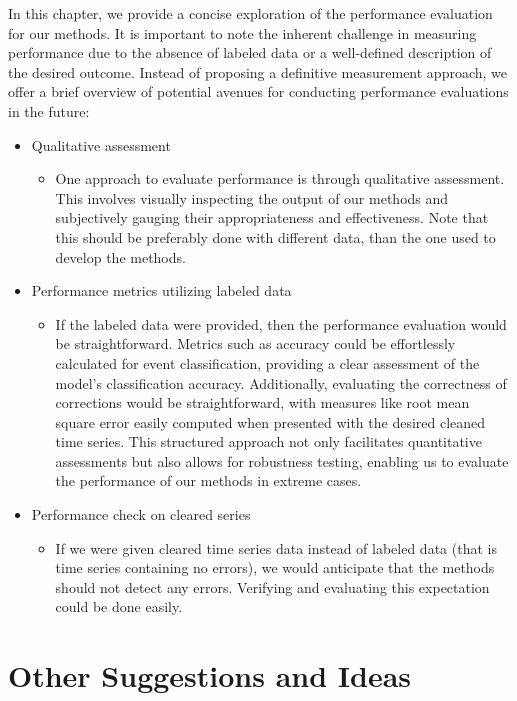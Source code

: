 \documentclass[12pt,a4paper]{article}
\begin{document}
In this chapter, we provide a concise exploration of the performance evaluation for our methods. It is important to note the inherent challenge in measuring performance due to the absence of labeled data or a well-defined description of the desired outcome. Instead of proposing a definitive measurement approach, we offer a brief overview of potential avenues for conducting performance evaluations in the future:
\begin{itemize}
    \item Qualitative assessment
    \begin{itemize}
        \item One approach  to evaluate performance is through qualitative assessment. This involves visually inspecting the output of our methods and subjectively gauging their appropriateness and effectiveness. Note that this should be preferably done with different data, than the one used to develop the methods.
    \end{itemize}
    \item Performance metrics utilizing labeled data
    \begin{itemize}
        \item If the labeled data were provided, then the performance evaluation would be straightforward. Metrics such as accuracy could be effortlessly calculated for event classification, providing a clear assessment of the model's classification accuracy. Additionally, evaluating the correctness of corrections would be straightforward, with measures like root mean square error easily computed when presented with the desired cleaned time series. This structured approach not only facilitates quantitative assessments but also allows for robustness testing, enabling us to evaluate the performance of our methods in extreme cases.
    \end{itemize}
    \item Performance check on cleared series
    \begin{itemize}
        \item If we were given cleared time series data instead of labeled data (that is time series containing no errors), we would anticipate that the methods should not detect any errors. Verifying and evaluating this expectation could be done easily.
    \end{itemize}
\end{itemize}




\newpage
\section{Other Suggestions and Ideas}\label{sec:other_sugg}
\end{document}
